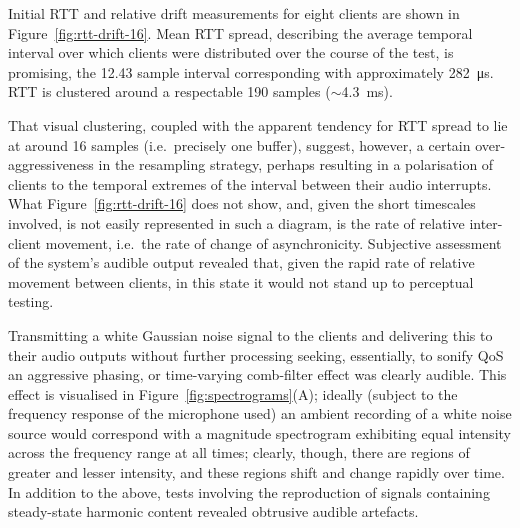\documentclass[utf8]{FrontiersinHarvard}
\newcommand{\figref}[1]{Figure~\ref{#1}}
\begin{document}
    Initial RTT and relative drift measurements for eight clients are shown in
    \figref{fig:rtt-drift-16}.
    Mean RTT spread, describing the average temporal interval over which clients
    were distributed over the course of the test, is promising, the 12.43 sample
    interval corresponding with approximately \qty{282}{\us}.
    RTT is clustered around a respectable 190 samples ($\sim$\qty{4.3}{\ms}).

    That visual clustering, coupled with the apparent tendency for RTT spread to
    lie at around 16 samples (i.e.\ precisely one buffer), suggest, however, a
    certain over-aggressiveness in the resampling strategy, perhaps resulting in a
    polarisation of clients to the temporal extremes of the interval between their
    audio interrupts.
    What \figref{fig:rtt-drift-16} does not show, and, given the short timescales
    involved, is not easily represented in such a diagram, is the rate of relative
    inter-client movement, i.e.\ the rate of change of asynchronicity.
    Subjective assessment of the system's audible output revealed that, given the
    rapid rate of relative movement between clients, in this state it would not
    stand up to perceptual testing.

    Transmitting a white Gaussian noise signal to the clients and delivering this to
    their audio outputs without further processing \textemdash{} seeking,
    essentially, to sonify QoS \textemdash{} an aggressive phasing, or time-varying
    comb-filter effect was clearly audible.
    This effect is visualised in \figref{fig:spectrograms}(A);
    ideally (subject to the frequency response of the microphone used) an ambient
    recording of a white noise source would correspond with a magnitude spectrogram
    exhibiting equal intensity across the frequency range at all times;
    clearly, though, there are regions of greater and lesser intensity, and these
    regions shift and change rapidly over time.
    In addition to the above, tests involving the reproduction of signals
    containing steady-state harmonic content revealed obtrusive audible artefacts.
\end{document}
